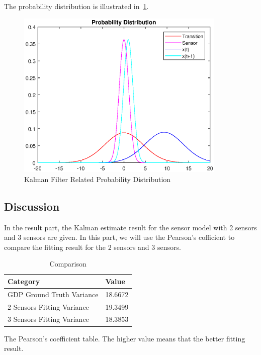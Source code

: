 \documentclass[11pt, a4paper]{article}
\begin{document}
The probability distribution is illustrated in~\ref{fig:pd_2}.

\begin{figure}[htbp]
	
	\centering 
	\includegraphics[width=10cm]{pd_2}
	
	\caption{Kalman Filter Related Probability Distribution}
	\label{fig:pd_2}
	
\end{figure}


\subsection{Discussion}

In the result part, the Kalman estimate result for the sensor model with 2 sensors and 3 sensors are given. In this part, we will use the Pearson's cofficient to compare the fitting result for the 2 sensors and 3 sensors.

\begin{table}[htbp] 
	\begin{center}
		\caption{Comparison}
		\begin{tabular}{l|l}  \hline
			Category & Value \\ \hline
			GDP Ground Truth Variance & 18.6672 \\ \hline
			2 Sensors Fitting Variance &  19.3499 \\ \hline
			3 Sensors Fitting Variance & 18.3853 \\ \hline
		\end{tabular}
		
		\label{tab:kf_meaning2}
	\end{center}
\end{table}	

The Pearson's coefficient table. The higher value means that the better fitting result.
\end{document}
